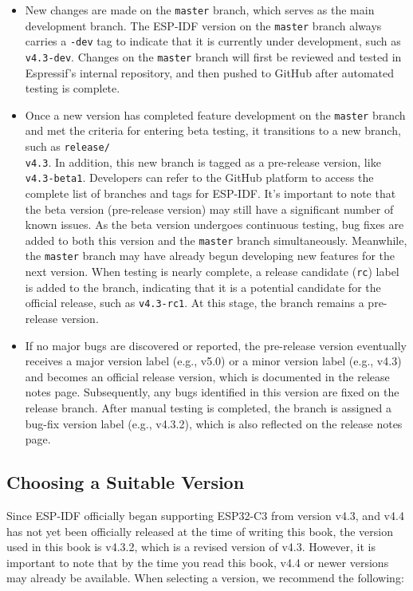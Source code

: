 \documentclass[a4paper,12pt]{book}
\begin{document}
\begin{itemize}[leftmargin=1.5em]
    \item New changes are made on the \verb|master| branch, which serves as the main development branch. The ESP-IDF version on the \verb|master| branch always carries a \verb|-dev| tag to indicate that it is currently under development, such as \verb|v4.3-dev|. Changes on the \verb|master| branch will first be reviewed and tested in Espressif’s internal repository, and then pushed to GitHub after automated testing is complete.
    \item Once a new version has completed feature development on the \verb|master| branch and met the criteria for entering beta testing, it transitions to a new branch, such as \verb|release/|\\ \verb|v4.3|. In addition, this new branch is tagged as a pre-release version, like \verb|v4.3-beta1|. Developers can refer to the GitHub platform to access the complete list of branches and tags for ESP-IDF. It’s important to note that the beta version (pre-release version) may still have a significant number of known issues. As the beta version undergoes continuous testing, bug fixes are added to both this version and the \verb|master| branch simultaneously. Meanwhile, the \verb|master| branch may have already begun developing new features for the next version. When testing is nearly complete, a release candidate (\verb|rc|) label is added to the branch, indicating that it is a potential candidate for the official release, such as \verb|v4.3-rc1|. At this stage, the branch remains a pre-release version.
    \item If no major bugs are discovered or reported, the pre-release version eventually receives a major version label (e.g., v5.0) or a minor version label (e.g., v4.3) and becomes an official release version, which is documented in the release notes page. Subsequently, any bugs identified in this version are fixed on the release branch. After manual testing is completed, the branch is assigned a bug-fix version label (e.g., v4.3.2), which is also reflected on the release notes page.
\end{itemize}

\subsection{Choosing a Suitable Version}
Since ESP-IDF officially began supporting ESP32-C3 from version v4.3, and v4.4 has not yet been officially released at the time of writing this book, the version used in this book is v4.3.2, which is a revised version of v4.3. However, it is important to note that by the time you read this book, v4.4 or newer versions may already be available. When selecting a version, we recommend the following:
\end{document}
